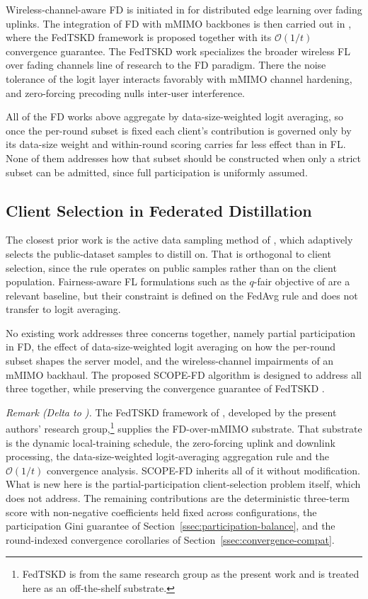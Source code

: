 \documentclass[journal]{IEEEtran}
\newcommand{\rev}[1]{{\color{blue}#1}}
\begin{document}
Wireless-channel-aware FD is initiated in \cite{ahn2019wireless} for distributed edge learning over fading uplinks. The integration of FD with mMIMO backbones is then carried out in \cite{mu2024fedtskd}, where the FedTSKD framework is proposed together with its $\mathcal{O}(1/t)$ convergence guarantee. The FedTSKD work specializes the broader wireless FL over fading channels line of research \cite{amiri2020federated, vu2020cell} to the FD paradigm. There the noise tolerance of the logit layer interacts favorably with mMIMO channel hardening, and zero-forcing precoding nulls inter-user interference.

All of the FD works above aggregate by data-size-weighted logit averaging, so once the per-round subset is fixed each client's contribution is governed only by its data-size weight and within-round scoring carries far less effect than in FL. None of them addresses how that subset should be constructed when only a strict subset can be admitted, since full participation is uniformly assumed.

\subsection{Client Selection in Federated Distillation}
\label{ssec:rw-fd-selection}

The closest prior work is the active data sampling method of \cite{liu2022active}, which adaptively selects the public-dataset samples to distill on. That is orthogonal to client selection, since the rule operates on public samples rather than on the client population. Fairness-aware FL formulations such as the $q$-fair objective of \cite{li2020qffl} are a relevant baseline, but their constraint is defined on the FedAvg rule and does not transfer to logit averaging.

No existing work addresses three concerns together, namely partial participation in FD, the effect of data-size-weighted logit averaging on how the per-round subset shapes the server model, and the wireless-channel impairments of an mMIMO backhaul. The proposed SCOPE-FD algorithm is designed to address all three together, while preserving the convergence guarantee of FedTSKD \cite{mu2024fedtskd}.

\textit{Remark (Delta to \cite{mu2024fedtskd}).} The FedTSKD framework of \cite{mu2024fedtskd}, developed by the present authors' research group,\footnote{FedTSKD \cite{mu2024fedtskd} is from the same research group as the present work and is treated here as an off-the-shelf substrate.} supplies the FD-over-mMIMO substrate. That substrate is the dynamic local-training schedule, the zero-forcing uplink and downlink processing, the data-size-weighted logit-averaging aggregation rule and the $\mathcal{O}(1/t)$ convergence analysis. SCOPE-FD inherits all of it without modification. What is new here is the partial-participation client-selection problem itself, which \cite{mu2024fedtskd} does not address. The remaining contributions are the deterministic three-term score with non-negative coefficients held fixed across configurations, the participation Gini guarantee of Section~\ref{ssec:participation-balance}, and \rev{the round-indexed convergence corollaries of Section~\ref{ssec:convergence-compat}.}
\end{document}
